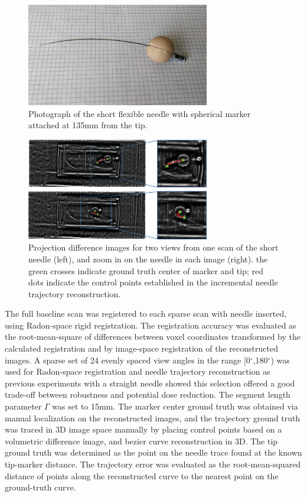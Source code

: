 \documentclass[letterpaper, 11 pt, conference]{ieeeconf} %
\begin{document}
\begin{figure}[t]
\centering
\includegraphics[width=8cm]{short_needle.jpg}
\caption{\small{Photograph of the short flexible needle with spherical marker attached at 135mm from the tip.}}
\label{short_needle_fig}
\end{figure}

\begin{figure}[b]
\centering
\includegraphics[width=8cm]{projection_diff_images.png}
\caption{\small{Projection difference images for two views from one scan of the short needle (left), and zoom in on the needle in each image (right). the green crosses indicate ground truth center of marker and tip; red dots indicate the control points established in the incremental needle trajectory reconstruction.}}
\label{proj_diff_fig}
\end{figure}

The full baseline scan was registered to each sparse scan with needle inserted, using Radon-space rigid registration. The registration accuracy was evaluated as the root-mean-square of differences between voxel coordinates transformed by the calculated registration and by image-space registration of the reconstructed images. 
A sparse set of 24 evenly spaced view angles in the range [0$^\circ$,180$^\circ$) was used for Radon-space registration and needle trajectory reconstruction as previous experiments \cite{medan2017reduced} with a straight needle showed this selection offered a good trade-off between robustness and potential dose reduction. The segment length parameter $\Gamma$ was set to 15mm.
The marker center ground truth was obtained via manual localization on the reconstructed images, and the trajectory ground truth was traced in 3D image space manually by placing control points based on a volumetric difference image, and bezier curve reconstruction in 3D. The tip ground truth was determined as the point on the needle trace found at the known tip-marker distance. The trajectory error was evaluated as the root-mean-squared distance of points along the reconstructed curve to the nearest point on the ground-truth curve.
\end{document}
